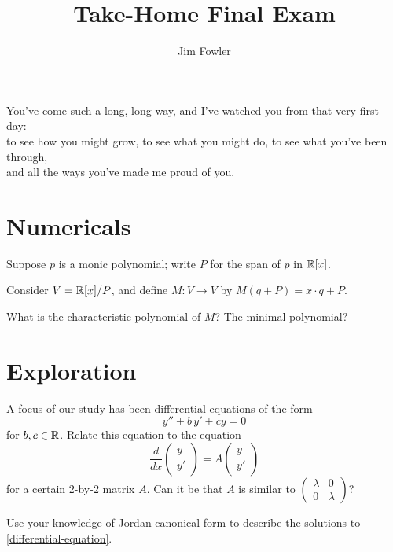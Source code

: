\documentclass{homework}
\title{Take-Home Final Exam}
\author{Jim Fowler}
\begin{document}
\maketitle

\begin{inspiration}
You've come such a long, long way, and I've watched you from that very first day: \\
to see how you might grow, to see what you might do, to see what you've been through, \\ and all the ways you've made me proud of you. \\ 
\end{inspiration}

\section{Numericals}


\begin{problem}
  Suppose $p$ is a monic polynomial; write $P$ for the span of $p$ in
  $\mathbb{R}[x]$.

  Consider $V = \mathbb{R}[x]/P$, and define $M : V \to V$ by $M(q + P) = x \cdot q + P$.

  What is the characteristic polynomial of $M$?  The minimal polynomial?
\end{problem}

\section{Exploration}

\begin{problem}
  A focus of our study has been differential equations of the form
  \begin{equation}\label{differential-equation}\tag{$*$}
    y'' + b\, y' + c y = 0
  \end{equation}
  for $b, c \in \mathbb{R}$.  Relate this equation to the equation
  \[
    \frac{d}{dx} \begin{pmatrix} y \\ y' \end{pmatrix} = A \begin{pmatrix} y \\ y' \end{pmatrix}
  \]
  for a certain $2$-by-$2$ matrix $A$.  Can it be that $A$ is similar to
  \(
    \displaystyle\begin{pmatrix} \lambda & 0 \\ 0 & \lambda  \end{pmatrix}
    \)?
    
  Use your knowledge of Jordan canonical form to describe the solutions to \eqref{differential-equation}.
\end{problem}
\end{document}
